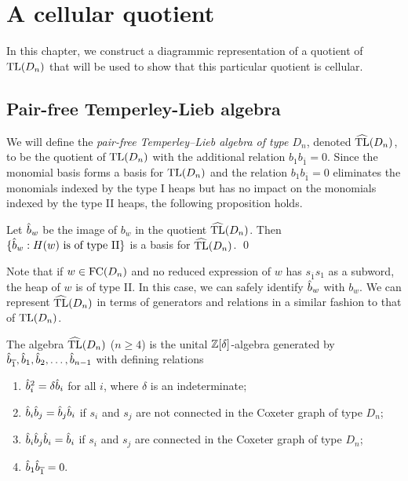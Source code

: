 \chapter{A cellular quotient}

In this chapter, we construct a diagrammic representation of a quotient of $\operatorname{TL}(D_n)$ that will be used to show that this particular quotient is cellular.

\section{Pair-free Temperley-Lieb algebra}\label{sec:pairfree}

We will define the \emph{pair-free Temperley--Lieb algebra of type $D_{n}$}, denoted $\operatorname{\widehat{TL}}(D_{n})$, to be the quotient of $\operatorname{TL}(D_n)$ with the additional relation $b_1b_{\overline{1}}=0$. 
Since the monomial basis forms a basis for $\operatorname{TL}(D_n)$ and the relation $b_1b_{\overline{1}}=0$ eliminates the monomials indexed by the type I heaps but has no impact on the monomials indexed by the type II heaps, the following proposition holds.

\begin{proposition}
Let $\hat{b}_w$ be the image of $b_w$ in the quotient $\operatorname{\widehat{TL}}(D_n)$. Then \\ $\{\hat{b}_w: H(w)\text{ is of type II}\}$ is a basis for $\operatorname{\widehat{TL}}(D_n)$.
\qed
\end{proposition}


Note that if $w\in\operatorname{FC}(D_n)$ and no reduced expression of $w$ has $s_{\overline{1}}s_1$ as a subword, the heap of $w$ is of type II. In this case, we can safely identify $\hat{b}_w$ with $b_w$. We can represent $\operatorname{\widehat{TL}}(D_{n})$ in terms of generators and relations in a similar fashion to that of $\operatorname{TL}(D_n)$.

\begin{remark}\label{def:pfTL(D)}
The algebra $\operatorname{\widehat{TL}}(D_{n})$ ($n\ge4$)  is the unital $\mathbb{Z}[\delta]$-algebra generated by $\hat{b}_{\overline{1}},\hat{b}_{1},\hat{b}_{2},\ldots,\hat{b}_{n-1}$ with defining relations
\begin{enumerate}[leftmargin=0.6in]
\item $\hat{b}_{i}^{2}=\delta \hat{b}_{i}$ for all $i$, where $\delta$ is an indeterminate;
\item $\hat{b}_{i}\hat{b}_{j} = \hat{b}_{j}\hat{b}_{i}$ if $s_i$ and $s_j$ are not connected in the Coxeter graph of type $D_n$;
\item $\hat{b}_{i}\hat{b}_{j}\hat{b}_{i} = \hat{b}_{i}$ if $s_i$ and $s_j$ are connected in the Coxeter graph of type $D_n$;
\item $\hat{b}_{1}\hat{b}_{\overline{1}}=0.$
\end{enumerate}
\end{remark}

